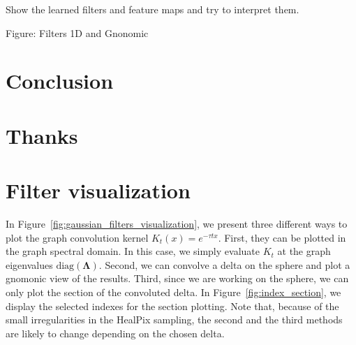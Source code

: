 \documentclass[final,twocolumn,3p,times,authoryear]{elsarticle}
\newcommand{\assign}[1]{{\color[rgb]{.8,.5,.8}{Assigned: #1 }}}
\renewcommand{\b}[1]{{\bm{#1}}}   %
\newcommand{\1}{\b{1}}              %
\newcommand{\0}{\b{0}}              %
\newcommand{\bLambda}{\b{\Lambda}}
\begin{document}
Show the learned filters and feature maps and try to interpret them.

Figure: Filters 1D and Gnonomic

\section{Conclusion}
\label{sec:conclusion}
\assign{Nathanaël, Tomek, Michaël}

\section*{Thanks}

\appendix

\section{Filter visualization}
\label{app:filter_visualization}

In Figure~\ref{fig:gaussian_filters_visualization}, we present three different
ways to plot the graph convolution kernel $K_t(x)=e^{-\tau t x}$. First, they can
be plotted in the graph spectral domain. In this case, we simply evaluate $K_t$
at the graph eigenvalues $\text{diag}(\bLambda)$. Second, we can convolve a
delta on the sphere and plot a gnomonic view of the results. Third, since we are
working on the sphere, we can only plot the section of the convoluted delta. In
Figure~\ref{fig:index_section}, we display the selected indexes for the section
plotting. Note that, because of the small irregularities in the HealPix
sampling, the second and the third methods are likely to change depending on the
chosen delta.
\end{document}
